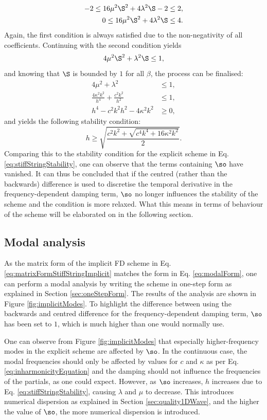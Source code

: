 {\begin{align*}
    -2\leq 16\mu^2\S^2+4\lambda^2\S - 2 &\leq 2,\\
    0\leq 16\mu^2\S^2+4\lambda^2\S &\leq 4.
\end{align*}
Again, the first condition is always satisfied due to the non-negativity of all coefficients. Continuing with the second condition yields
\begin{equation*}
    4\mu^2\S^2+\lambda^2\S \leq 1,
\end{equation*} 
and knowing that $\S$ is bounded by $1$ for all $\beta$, the process can be finalised:
\begin{align*}
    4\mu^2+\lambda^2 &\leq 1,\\
    \frac{4\kappa^2k^2}{h^4}+\frac{c^2k^2}{h^2} &\leq 1,\\
    h^4 - c^2k^2h^2 - 4\kappa^2k^2 &\geq 0,
\end{align*}
and yields the following stability condition:
\begin{equation}\label{eq:implicitStability}
    h \geq \sqrt{\frac{c^2k^2 + \sqrt{c^4k^4 + 16\kappa^2k^2}}{2}}.
\end{equation}
Comparing this to the stability condition for the explicit scheme in Eq. \eqref{eq:stiffStringStability}, one can observe that the terms containing $\so$ have vanished. It can thus be concluded that if the centred (rather than the backwards) difference is used to discretise the temporal derivative in the frequency-dependent damping term, $\so$ no longer influences the stability of the scheme and the condition is more relaxed. What this means in terms of behaviour of the scheme will be elaborated on in the following section.

\subsection{Modal analysis}
As the matrix form of the implicit FD scheme in Eq. \eqref{eq:matrixFormStiffStringImplicit} matches the form in Eq. \eqref{eq:modalForm}, one can perform a modal analysis by writing the scheme in one-step form as explained in Section \ref{sec:oneStepForm}. The results of the analysis are shown in Figure \ref{fig:implicitModes}. To highlight the difference between using the backwards and centred difference for the frequency-dependent damping term, $\so $ has been set to $1$, which is much higher than one would normally use.

One can observe from Figure \ref{fig:implicitModes} that especially higher-frequency modes in the explicit scheme are affected by $\so$.  
In the continuous case, the modal frequencies should only be affected by values for $c$ and $\kappa$ as per Eq. \eqref{eq:inharmonicityEquation} and the damping should not influence the frequencies of the partials, as one could expect. However, as $\so$ increases, $h$ increases due to Eq. \eqref{eq:stiffStringStability}, causing $\lambda$ and $\mu$ to decrease. This introduces numerical dispersion as explained in Section \ref{sec:quality1DWave}, and the higher the value of $\so$, the more numerical dispersion is introduced.

}
